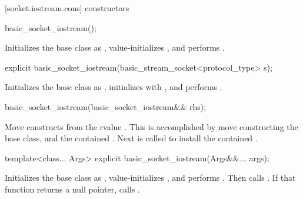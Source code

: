 [socket.iostream.cons]{ constructors}

\begin{itemdecl}
basic_socket_iostream();
\end{itemdecl}


\begin{itemdescr}
\pnum
\effects Initializes the base class as , value-initializes , and performs .
\end{itemdescr}

\begin{itemdecl}
explicit basic_socket_iostream(basic_stream_socket<protocol_type> s);
\end{itemdecl}

\begin{itemdescr}
\pnum
\effects Initializes the base class as , initializes  with , and performs .
\end{itemdescr}

\begin{itemdecl}
basic_socket_iostream(basic_socket_iostream&& rhs);
\end{itemdecl}

\begin{itemdescr}
\pnum
\effects Move constructs from the rvalue . This is accomplished by move constructing the base class, and the contained . Next  is called to install the contained .
\end{itemdescr}

\begin{itemdecl}
template<class... Args>
  explicit basic_socket_iostream(Args&&... args);
\end{itemdecl}


\begin{itemdescr}
\pnum
\effects Initializes the base class as , value-initializes , and performs . Then calls . If that function returns a null pointer, calls .
\end{itemdescr}

